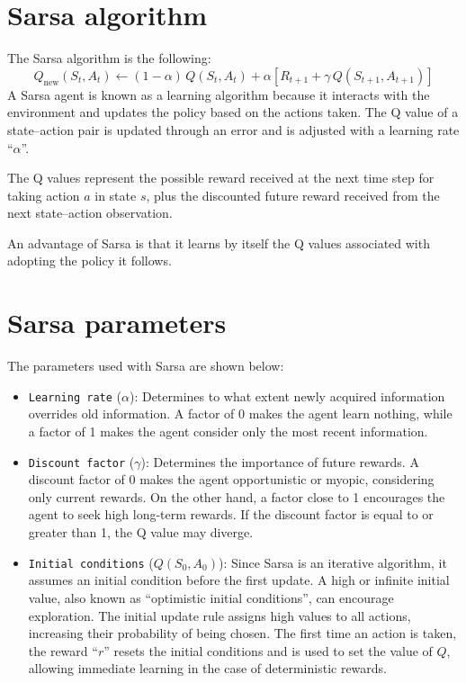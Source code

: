 \documentclass[12pt,a4paper]{book}
\begin{document}
\section{Sarsa algorithm}
The Sarsa algorithm is the following:
\begin{equation}
  Q_{\mathrm{new}}(S_t, A_t) \longleftarrow (1-\alpha)\,Q(S_t, A_t)
    + \alpha\left[R_{t+1} + \gamma\, Q(S_{t+1}, A_{t+1})\right]
\end{equation}
A Sarsa agent is known as a learning algorithm because it interacts with the environment and
updates the policy based on the actions taken. The Q value of a state--action pair is updated
through an error and is adjusted with a learning rate ``$\alpha$''.

The Q values represent the possible reward received at the next time step for taking action $a$ in
state $s$, plus the discounted future reward received from the next state--action observation.

An advantage of Sarsa is that it learns by itself the Q values associated with adopting the policy
it follows.

\section{Sarsa parameters}
The parameters used with Sarsa are shown below:
\begin{itemize}
  \item \texttt{Learning rate} ($\alpha$): Determines to what extent newly acquired information
    overrides old information. A factor of 0 makes the agent learn nothing, while a factor of 1
    makes the agent consider only the most recent information.
  \item \texttt{Discount factor} ($\gamma$): Determines the importance of future rewards. A discount
    factor of 0 makes the agent opportunistic or myopic, considering only current rewards. On the
    other hand, a factor close to 1 encourages the agent to seek high long-term rewards. If the
    discount factor is equal to or greater than 1, the Q value may diverge.
  \item \texttt{Initial conditions} ($Q(S_0, A_0)$): Since Sarsa is an iterative algorithm, it
    assumes an initial condition before the first update. A high or infinite initial value, also
    known as ``optimistic initial conditions'', can encourage exploration. The initial update rule
    assigns high values to all actions, increasing their probability of being chosen. The first time
    an action is taken, the reward ``$r$'' resets the initial conditions and is used to set the
    value of $Q$, allowing immediate learning in the case of deterministic rewards.
\end{itemize}
\end{document}
